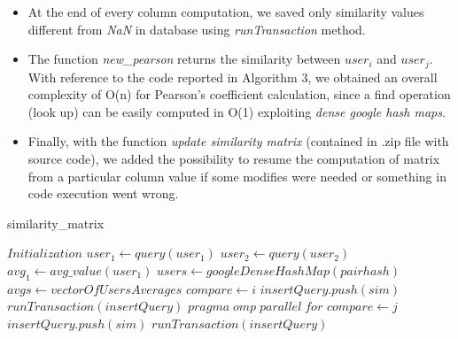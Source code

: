 \begin{itemize}
	\item At the end of every column computation, we saved only similarity values different from \textit{NaN} in database using \textit{runTransaction} method.
	\item The function \textit{new\_pearson} returns the similarity between $user_i$ and $user_j$. With reference to the code reported in Algorithm 3, we obtained an overall complexity of O(n) for Pearson's coefficient calculation, since a find operation (look up) can be easily computed in O(1) exploiting \textit{dense google hash maps}.
	\item Finally, with the function \textit{update similarity matrix} (contained in .zip file with source code), we added the possibility to resume the computation of matrix from a particular column value if some modifies were needed or something in code execution went wrong.
\end{itemize}

\begin{algorithm}
	\caption{similarity\_matrix}
	\begin{algorithmic} 
		\STATE $Initialization$
		\STATE $user_1 \leftarrow query(user_1)$
		\STATE $user_2 \leftarrow query(user_2)$
		\STATE $avg_1 \leftarrow avg\_value(user_1)$
		\STATE $users \leftarrow googleDenseHashMap(pairhash)$
		\STATE $avgs \leftarrow vectorOfUsersAverages$
		\vspace{4mm}	
		\STATE $compare \leftarrow i$
		\STATE $insertQuery.push(sim)$
		\ENDIF
		\ENDFOR
		\STATE $runTransaction(insertQuery)$
		\vspace{4mm}
		\STATE $pragma \; omp \; parallel \; for$
		\STATE $compare \leftarrow j$
		\STATE $insertQuery.push(sim)$
		\ENDIF
		\ENDFOR
		\STATE $runTransaction(insertQuery)$
		\ENDFOR
	\end{algorithmic}
\end{algorithm}

